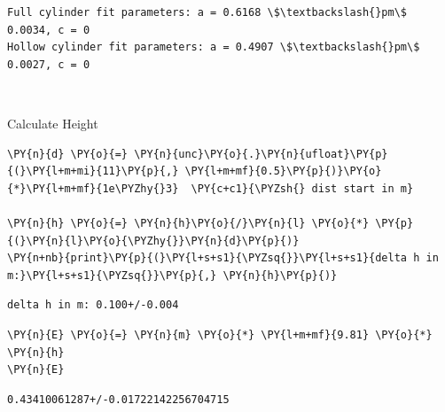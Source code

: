     \begin{Verbatim}[commandchars=\\\{\}]
Full cylinder fit parameters: a = 0.6168 \$\textbackslash{}pm\$ 0.0034, c = 0
Hollow cylinder fit parameters: a = 0.4907 \$\textbackslash{}pm\$ 0.0027, c = 0
    \end{Verbatim}

    \begin{center}
    \end{center}
    { \hspace*{\fill} \\}
    
    Calculate Height

    \begin{tcolorbox}[breakable, size=fbox, boxrule=1pt, pad at break*=1mm,colback=cellbackground, colframe=cellborder]
\begin{Verbatim}[commandchars=\\\{\}]
\PY{n}{d} \PY{o}{=} \PY{n}{unc}\PY{o}{.}\PY{n}{ufloat}\PY{p}{(}\PY{l+m+mi}{11}\PY{p}{,} \PY{l+m+mf}{0.5}\PY{p}{)}\PY{o}{*}\PY{l+m+mf}{1e\PYZhy{}3}  \PY{c+c1}{\PYZsh{} dist start in m}

\PY{n}{h} \PY{o}{=} \PY{n}{h}\PY{o}{/}\PY{n}{l} \PY{o}{*} \PY{p}{(}\PY{n}{l}\PY{o}{\PYZhy{}}\PY{n}{d}\PY{p}{)}
\PY{n+nb}{print}\PY{p}{(}\PY{l+s+s1}{\PYZsq{}}\PY{l+s+s1}{delta h in m:}\PY{l+s+s1}{\PYZsq{}}\PY{p}{,} \PY{n}{h}\PY{p}{)}
\end{Verbatim}
\end{tcolorbox}

    \begin{Verbatim}[commandchars=\\\{\}]
delta h in m: 0.100+/-0.004
    \end{Verbatim}

    \begin{tcolorbox}[breakable, size=fbox, boxrule=1pt, pad at break*=1mm,colback=cellbackground, colframe=cellborder]
\begin{Verbatim}[commandchars=\\\{\}]
\PY{n}{E} \PY{o}{=} \PY{n}{m} \PY{o}{*} \PY{l+m+mf}{9.81} \PY{o}{*} \PY{n}{h}
\PY{n}{E}
\end{Verbatim}
\end{tcolorbox}

            \begin{tcolorbox}[breakable, size=fbox, boxrule=.5pt, pad at break*=1mm, opacityfill=0]
\begin{Verbatim}[commandchars=\\\{\}]
0.43410061287+/-0.01722142256704715
\end{Verbatim}
\end{tcolorbox}
        
